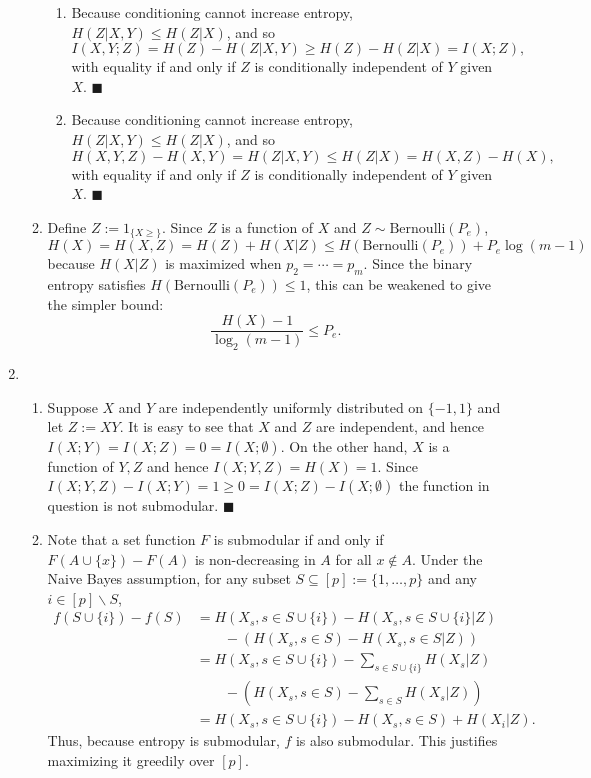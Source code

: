 \documentclass[11pt]{article}
\renewcommand{\qed}{\quad \ensuremath{\blacksquare}}
\newcommand{\sminus}{\backslash}
\begin{document}
\begin{enumerate}
\begin{enumerate}
\begin{enumerate}
\item Because conditioning cannot increase entropy, $H(Z|X,Y) \leq H(Z|X)$, and
so
\[I(X,Y;Z)
    = H(Z) - H(Z|X,Y)
    \geq H(Z) - H(Z|X)
    = I(X;Z),
\]
with equality if and only if $Z$ is conditionally independent of $Y$ given $X$.
\qed

\item Because conditioning cannot increase entropy, $H(Z|X,Y) \leq H(Z|X)$, and
so
\[H(X,Y,Z) - H(X,Y)
    = H(Z|X,Y)
    \leq H(Z|X)
    = H(X,Z) - H(X),
\]
with equality if and only if $Z$ is conditionally independent of $Y$ given $X$.
\qed
\end{enumerate}

\item Define $Z := 1_{\{X \geq \}}$. Since $Z$ is a function of $X$ and
$Z \sim \text{Bernoulli}(P_e)$,
\[H(X) = H(X,Z) = H(Z) + H(X|Z) \leq H(\text{Bernoulli}(P_e)) + P_e \log(m - 1)
\]
because $H(X|Z)$ is maximized when $p_2 = \cdots = p_m$. Since the binary
entropy satisfies $H(\text{Bernoulli}(P_e)) \leq 1$, this can be weakened to
give the simpler bound:
\[\frac{H(X) - 1}{\log_2(m - 1)} \leq P_e.\]
\end{enumerate}

\item
\begin{enumerate}
\item Suppose $X$ and $Y$ are independently uniformly distributed on $\{-1,1\}$
and let $Z := XY$. It is easy to see that $X$ and $Z$ are independent, and
hence $I(X;Y) = I(X;Z) = 0 = I(X;\emptyset)$. On the other hand, $X$ is a
function of $Y,Z$ and hence $I(X;Y,Z) = H(X) = 1$. Since
$I(X;Y,Z) - I(X;Y) = 1 \geq 0 = I(X;Z) - I(X;\emptyset)$ the function in
question is not submodular. \qed

\item Note that a set function $F$ is submodular if and only if
$F(A \cup \{x\}) - F(A)$ is non-decreasing in $A$ for all $x \notin A$. Under
the Naive Bayes assumption, for any subset $S \subseteq [p] := \{1,\dots,p\}$
and any $i \in [p] \sminus S$,
\begin{align*}
f(S \cup \{i\}) - f(S)
 &  = H(X_s, s \in S \cup \{i\}) - H(X_s, s \in S \cup \{i\} | Z)   \\
 &  \qquad - \left( H(X_s, s \in S) - H(X_s, s \in S | Z) \right)   \\
 &  = H(X_s, s \in S \cup \{i\}) - \sum_{s \in S \cup \{i\}} H(X_s | Z) \\
 &  \qquad - \left( H(X_s, s \in S) - \sum_{s \in S} H(X_s | Z) \right) \\
 &  = H(X_s, s \in S \cup \{i\}) - H(X_s, s \in S) + H(X_i | Z).
\end{align*}
Thus, because entropy is submodular, $f$ is also submodular. This justifies
maximizing it greedily over $[p]$.
\end{enumerate}


\end{enumerate}
\end{document}
